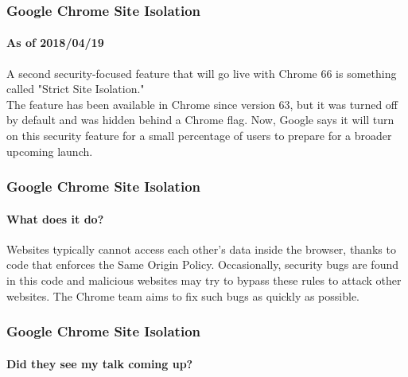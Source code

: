 \documentclass[aspectratio=169]{beamer}
\begin{document}
\begin{frame}
  \frametitle{Google Chrome Site Isolation}
  \framesubtitle{As of 2018/04/19}
  \begin{center}
    \begin{tcolorbox}[title=\href{https://www.bleepingcomputer.com/news/google/google-chrome-66-released-today-focuses-on-security/}{Bleeping Computer},colback=gray]
      A second security-focused feature that will go live with Chrome 66 is something called "Strict Site Isolation." \\
      \newline
      The feature has been available in Chrome since version 63, but it was turned off by default and was hidden behind a Chrome flag. Now, Google says it will turn on this security feature for a small percentage of users to prepare for a broader upcoming launch.\\
    \end{tcolorbox}
  \end{center}
\end{frame}
\begin{frame}
  \frametitle{Google Chrome Site Isolation}
  \framesubtitle{What does it do?}
  \begin{center}
      
    \begin{tcolorbox}[title=\href{http://www.chromium.org/Home/chromium-security/site-isolation}{Google Chrome Site Security Isolation},colback=gray]
      Websites typically cannot access each other's data inside the browser, thanks to code that enforces the Same Origin Policy.  Occasionally, security bugs are found in this code and malicious websites may try to bypass these rules to attack other websites.  The Chrome team aims to fix such bugs as quickly as possible.
    \end{tcolorbox}
  \end{center}
\end{frame}
\begin{frame}
  \frametitle{Google Chrome Site Isolation}
  \framesubtitle{Did they see my talk coming up?}
  \begin{center}
  \end{center}
\end{frame}
\end{document}

